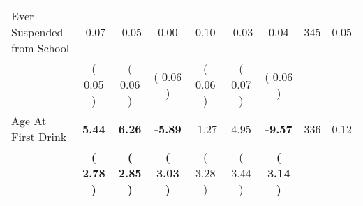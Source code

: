 \begin{tabular}{lcccccccc}
Ever Suspended from School &     -0.07 &     -0.05 &      0.00 &      0.10 &     -0.03 &      0.04 & 345 &       0.05 \\ 
 & (     0.05 ) & (     0.06 ) & (     0.06 ) & (     0.06 ) & (     0.07 ) & (     0.06 ) & \\
Age At First Drink & \textbf{     5.44} & \textbf{     6.26} & \textbf{    -5.89} &     -1.27 &      4.95 & \textbf{    -9.57} & 336 &       0.12 \\ 
 & \textbf{(     2.78 )} & \textbf{(     2.85 )} & \textbf{(     3.03 )} & (     3.28 ) & (     3.44 ) & \textbf{(     3.14 )} & \\
\bottomrule
\end{tabular}
